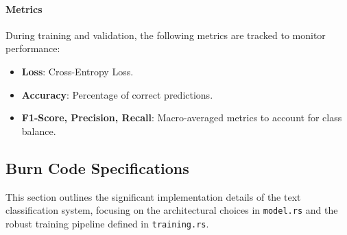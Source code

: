 \documentclass{ieeeaccess}
\begin{document}
\paragraph{Metrics}
During training and validation, the following metrics are tracked to monitor performance:
\begin{itemize}
    \item \textbf{Loss}: Cross-Entropy Loss.
    \item \textbf{Accuracy}: Percentage of correct predictions.
    \item \textbf{F1-Score, Precision, Recall}: Macro-averaged metrics to account for class balance.
\end{itemize}

\subsection{Burn Code Specifications}

This section outlines the significant implementation details of the text classification system, focusing on the architectural choices in \texttt{model.rs} and the robust training pipeline defined in \texttt{training.rs}.
\end{document}
